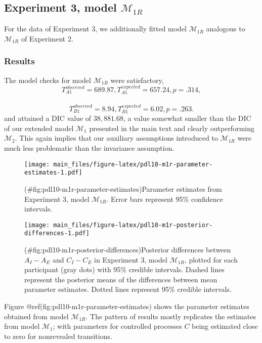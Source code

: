 \begin{appendix}
\hypertarget{experiment-3-model-mathcalm_1r}{%
\subsection{\texorpdfstring{Experiment 3, model
\(\mathcal{M}_{1R}\)}{Experiment 3, model \textbackslash{}mathcal\{M\}\_\{1R\}}}\label{experiment-3-model-mathcalm_1r}}

For the data of Experiment 3, we additionally fitted model
\(\mathcal{M}_{1R}\) analogous to \(\mathcal{M}_{1R}\) of Experiment 2.

\hypertarget{results-2}{%
\subsubsection{Results}\label{results-2}}

The model checks for model \(\mathcal{M}_{1R}\) were satisfactory,
\[T_{A1}^{observed} = 689.87, T_{A1}^{expected} = 657.24, p = .314,\]~
\[T_{B1}^{observed} = 8.94, T_{B1}^{expected} = 6.02, p = .263.\] and
attained a DIC value of \(38{,}881.68\), a value somewhat smaller than
the DIC of our extended model \(\mathcal{M}_{1}\) presented in the main
text and clearly outperforming \(\mathcal{M}_2\). This again implies
that our auxiliary assumptions introduced to \(\mathcal{M}_{1R}\) were
much less problematic than the invariance assumption.

\begin{figure}
\centering
\texttt{[image: main\_files/figure-latex/pdl10-m1r-parameter-estimates-1.pdf]}
\caption{(\#fig:pdl10-m1r-parameter-estimates)Parameter estimates from
Experiment 3, model \(\mathcal{M}_{1R}\). Error bars represent 95\%
confidence intervals.}
\end{figure}

\begin{figure}
\centering
\texttt{[image: main\_files/figure-latex/pdl10-m1r-posterior-differences-1.pdf]}
\caption{(\#fig:pdl10-m1r-posterior-differences)Posterior differences
between \(A_I - A_E\) and \(C_I - C_E\) in Experiment 3, model
\(\mathcal{M}_{1R}\), plotted for each participant (gray dots) with 95\%
credible intervals. Dashed lines represent the posterior means of the
differences between mean parameter estimates. Dotted lines represent
95\% credible intervals.}
\end{figure}

Figure @ref(fig:pdl10-m1r-parameter-estimates) shows the parameter
estimates obtained from model \(\mathcal{M}_{1R}\). The pattern of
results mostly replicates the estimates from model \(\mathcal{M}_1\);
with parameters for controlled processes \(C\) being estimated close to
zero for nonrevealed transitions.


\end{appendix}
